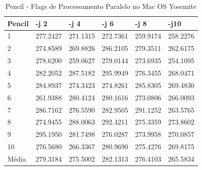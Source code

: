 \begin{table}[!ht]
\centering
\tiny
\caption{Pencil - Flags de Processamento Paralelo no Mac OS Yosemite}
\label{tab:flag_processamento_paralelo:mac:pencil}
\begin{tabular}{llllll}
\textbf{Pencil} & \textbf{-j 2} & \textbf{-j 4} & \textbf{-j 6} & \textbf{-j 8} & \textbf{-j10}  \\ \toprule
1               & 277.2427  &   271.1315 &    272.7361  &   259.9174  &   258.2276          \\ 
2               & 274.8589  &   269.8826 &    286.2105  &   279.3511  &   262.6175          \\ 
3               & 278.6200  &   259.0627 &    279.0144  &   273.6935  &   254.1095          \\ 
4               & 282.2052  &   287.5182 &    295.9949  &   276.3455  &   268.0471          \\ 
5               & 284.8937  &   274.3423 &    274.8261  &   285.8305  &   269.4830          \\ 
6               & 261.9388  &   280.4124 &    280.1616  &   273.0806  &   266.0093          \\ 
7               & 286.7162  &   276.5590 &    282.9505  &   291.1252  &   263.5765          \\ 
8               & 274.9455  &   288.0063 &    292.4211  &   275.3359  &   273.8602          \\ 
9               & 295.1950  &   281.7498 &    276.0287  &   273.9958  &   270.0857          \\ 
10              & 276.5680  &   266.3367 &    280.9690  &   275.4276  &   269.8175          \\ \bottomrule
Média           & 279.3184  &   275.5002 &    282.1313  &   276.4103  &   265.5834          \\ 
\end{tabular}
\end{table}


